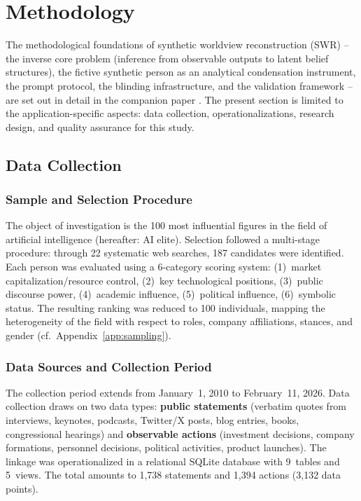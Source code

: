 \documentclass[12pt,a4paper]{article}
\begin{document}
\section{Methodology}
\label{sec:methodik}

The methodological foundations of synthetic worldview reconstruction (SWR) -- the inverse core problem (inference from observable outputs to latent belief structures), the fictive synthetic person as an analytical condensation instrument, the prompt protocol, the blinding infrastructure, and the validation framework -- are set out in detail in the companion paper \citep{Geiger2026SWR}. The present section is limited to the application-specific aspects: data collection, operationalizations, research design, and quality assurance for this study.


\subsection{Data Collection}
\label{sec:methodik:daten}

\subsubsection{Sample and Selection Procedure}

The object of investigation is the 100 most influential figures in the field of artificial intelligence (hereafter: AI elite). Selection followed a multi-stage procedure: through 22 systematic web searches, 187 candidates were identified. Each person was evaluated using a 6-category scoring system: (1)~market capitalization/resource control, (2)~key technological positions, (3)~public discourse power, (4)~academic influence, (5)~political influence, (6)~symbolic status. The resulting ranking was reduced to 100 individuals, mapping the heterogeneity of the field with respect to roles, company affiliations, stances, and gender (cf.\ Appendix~\ref{app:sampling}).

\subsubsection{Data Sources and Collection Period}

The collection period extends from January~1, 2010 to February~11, 2026. Data collection draws on two data types: \textbf{public statements} (verbatim quotes from interviews, keynotes, podcasts, Twitter/X posts, blog entries, books, congressional hearings) and \textbf{observable actions} (investment decisions, company formations, personnel decisions, political activities, product launches). The linkage was operationalized in a relational SQLite database with 9~tables and 5~views. The total amounts to 1,738 statements and 1,394 actions (3,132 data points).
\end{document}

